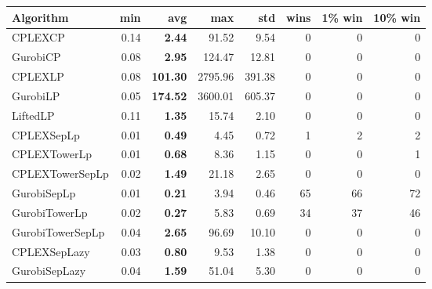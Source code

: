\begin{tabular}{lrrrrrrr}
Algorithm & min & avg & max & std
& wins & 1\% win & 10\% win 
\\
\hline
CPLEXCP&0.14& \bf2.44& 91.52& 9.54&0&0&0\\
GurobiCP&0.08& \bf2.95& 124.47& 12.81&0&0&0\\
CPLEXLP&0.08& \bf101.30& 2795.96& 391.38&0&0&0\\
GurobiLP&0.05& \bf174.52& 3600.01& 605.37&0&0&0\\
LiftedLP&0.11& \bf1.35& 15.74& 2.10&0&0&0\\
CPLEXSepLp&0.01& \bf0.49& 4.45& 0.72&1&2&2\\
CPLEXTowerLp&0.01& \bf0.68& 8.36& 1.15&0&0&1\\
CPLEXTowerSepLp&0.02& \bf1.49& 21.18& 2.65&0&0&0\\
GurobiSepLp&0.01& \bf0.21& 3.94& 0.46&65&66&72\\
GurobiTowerLp&0.02& \bf0.27& 5.83& 0.69&34&37&46\\
GurobiTowerSepLp&0.04& \bf2.65& 96.69& 10.10&0&0&0\\
CPLEXSepLazy&0.03& \bf0.80& 9.53& 1.38&0&0&0\\
GurobiSepLazy&0.04& \bf1.59& 51.04& 5.30&0&0&0
\end{tabular}
